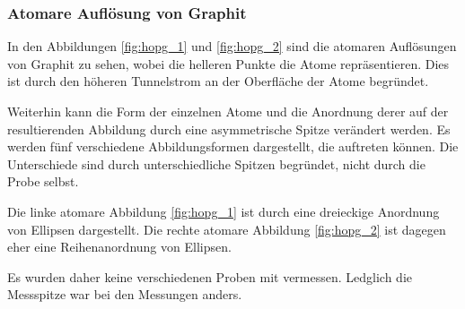 \documentclass[12pt,a4paper]{scrartcl}
\numberwithin{equation}{section} %
\begin{document}
\hypertarget{HOPC atomar}{
\subsubsection{Atomare Auflösung von Graphit}\label{HOPC atomar}}
In den Abbildungen \ref{fig:hopg_1} und \ref{fig:hopg_2} sind die atomaren Auflösungen von Graphit zu sehen, wobei die helleren Punkte die Atome repräsentieren. Dies ist durch den höheren Tunnelstrom an der Oberfläche der Atome begründet. \cite{Mizes}

Weiterhin kann die Form der einzelnen Atome und die Anordnung derer auf der resultierenden Abbildung durch eine asymmetrische Spitze verändert werden. \cite{Mizes} Es werden fünf verschiedene Abbildungsformen dargestellt, die auftreten können. Die Unterschiede sind durch unterschiedliche Spitzen begründet, nicht durch die Probe selbst.

Die linke atomare Abbildung \ref{fig:hopg_1} ist durch eine dreieckige Anordnung von Ellipsen dargestellt. Die rechte atomare Abbildung \ref{fig:hopg_2} ist dagegen eher eine Reihenanordnung von Ellipsen.

Es wurden daher keine verschiedenen Proben mit vermessen. Ledglich die Messspitze war bei den Messungen anders.
\end{document}
